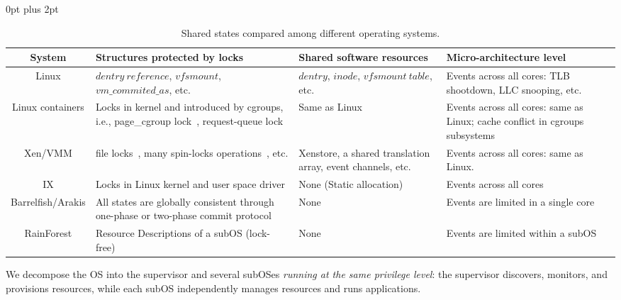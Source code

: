 \documentclass[pageno]{jpaper}
\begin{document}
\begin{table*}[t]
\renewcommand{\arraystretch}{1.1}
\setlength{\abovecaptionskip}{3pt}
\setlength{\belowcaptionskip}{0pt}
\setlength{\textfloatsep} {0pt plus 2pt}
\setlength{\tabcolsep}{5pt}
\centering
\caption{Shared states compared among different operating systems.}
\label{tab_confined_states}
\newsavebox{\tablebox}
\begin{lrbox}{\tablebox}
\begin{tabular}{|c|p{200pt}|p{120pt}|p{160pt}|}
\hline
\textbf{System} & \textbf{Structures protected by locks} & \textbf{Shared software resources} & \textbf{Micro-architecture level}	\\ \hline
Linux & $dentry\ reference$, $vfsmount$, $vm\_commited\_as$, etc.~\cite{Boyd-Wickizer:2010:MOSBench}
		 & $dentry$, $inode$, $vfsmount\ table$, etc.~\cite{Boyd-Wickizer:2010:MOSBench}
		 & Events across all cores: TLB shootdown, LLC snooping, etc. \\ \hline
Linux containers &  Locks in kernel and introduced by cgroups, i.e., page\_cgroup lock~\cite{Ahn:2016:IIR}, request-queue lock~\cite{Huang:2016:ESL}
		& Same as Linux
		& Events across all cores: same as Linux; cache conflict in cgroups subsystems\\ \hline
Xen/VMM & file locks~\cite{Nitu:2017:SBQ}, many spin-locks operations~\cite{Zhong:2012:OXH}, etc.
		& Xenstore, a shared translation array, event channels, etc.~\cite{barham2003xen}
		& Events across all cores: same as Linux. \\ \hline
IX &   Locks in Linux kernel and user space driver
		& None (Static allocation)
		& Events across all cores \\ \hline
Barrelfish/Arakis & All states are globally consistent through one-phase or two-phase commit protocol~\cite{Baumann:2009:multikernel}
		& None
		& Events are limited in a single core \\ \hline
RainForest & Resource Descriptions of a subOS (lock-free)
		& None
		& Events are limited within a subOS \\ \hline
\end{tabular}
\end{lrbox}
\scalebox{0.8}{\usebox{\tablebox}}
\end{table*}

We   decompose the OS into the supervisor and several subOSes \emph{running at the same privilege level}: the supervisor discovers, monitors, and provisions resources,  while each  subOS independently manages resources and runs applications.
\end{document}
